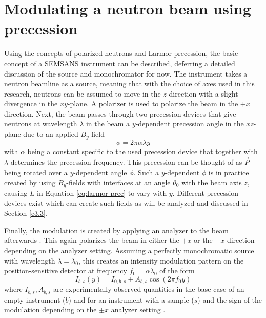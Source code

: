 \section{Modulating a neutron beam using precession}
\label{c2.2}
Using the concepts of polarized neutrons and Larmor precession, the basic concept of a SEMSANS instrument can be described, deferring a detailed discussion of the source and monochromator for now. The instrument takes a neutron beamline as a source, meaning that with the choice of axes used in this research, neutrons can be assumed to move in the $z$-direction with a slight divergence in the $xy$-plane. A polarizer is used to polarize the beam in the $+x$ direction. Next, the beam passes through two precession devices  that give neutrons at wavelength $\lambda$ in the beam a $y$-dependent precession angle in the $xz$-plane due to an applied $B_y$-field %
\begin{equation}
	\phi = 2\pi\alpha\lambda y \label{eq:precession-freq}
\end{equation}
with $\alpha$ being a constant specific to the used precession device that together with $\lambda$ determines the precession frequency. This precession can be thought of as $\vec{P}$ being rotated over a $y$-dependent angle $\phi$. Such a $y$-dependent $\phi$ is in practice created by using $B_y$-fields with interfaces at an angle $\theta_0$ with the beam axis $z$, causing $L$ in Equation \eqref{eq:larmor-prec} to vary with $y$. Different precession devices exist which can create such fields as will be analyzed and discussed in Section \ref{c3.3}.

Finally, the modulation is created by applying an analyzer to the beam afterwards \cite{mezei1972}. This again polarizes the beam in either the $+x$ or the $-x$ direction depending on the analyzer setting. Assuming a perfectly monochromatic source with wavelength $\lambda = \lambda_0$, this creates an intensity modulation pattern on the position-sensitive detector at frequency $f_0 = \alpha\lambda_0$ of the form
\begin{equation}
	I_{b,s}(y) = I_{0, b,s} \pm A_{b,s}\cos(2\pi f_0y) \label{eq:mono-modulation}
\end{equation}
where $I_{b,s}, A_{b,s}$ are experimentally observed quantities in the base case of an empty instrument ($b$) and for an instrument with a sample ($s$) and the sign of the modulation depending on the $\pm x$ analyzer setting \cite{parnell2023}. 
